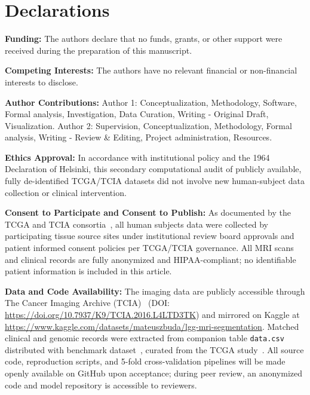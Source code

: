 \documentclass[11pt,a4paper]{article}
\begin{document}
\section*{Declarations}
\begingroup
\fontsize{7.5pt}{8.8pt}\selectfont
\noindent\textbf{Funding:} The authors declare that no funds, grants, or other support were received during the preparation of this manuscript.\par\vspace{0.005em}
\noindent\textbf{Competing Interests:} The authors have no relevant financial or non-financial interests to disclose.\par\vspace{0.005em}
\noindent\textbf{Author Contributions:} Author 1: Conceptualization, Methodology, Software, Formal analysis, Investigation, Data Curation, Writing - Original Draft, Visualization. Author 2: Supervision, Conceptualization, Methodology, Formal analysis, Writing - Review \& Editing, Project administration, Resources.\par\vspace{0.005em}
\noindent\textbf{Ethics Approval:} In accordance with institutional policy and the 1964 Declaration of Helsinki, this secondary computational audit of publicly available, fully de-identified TCGA/TCIA datasets did not involve new human-subject data collection or clinical intervention.\par\vspace{0.005em}
\noindent\textbf{Consent to Participate and Consent to Publish:} As documented by the TCGA and TCIA consortia~\cite{clark2013cancer,pedano2016cancer}, all human subjects data were collected by participating tissue source sites under institutional review board approvals and patient informed consent policies per TCGA/TCIA governance. All MRI scans and clinical records are fully anonymized and HIPAA-compliant; no identifiable patient information is included in this article.\par\vspace{0.005em}
\noindent\textbf{Data and Code Availability:} The imaging data are publicly accessible through The Cancer Imaging Archive (TCIA)~\cite{clark2013cancer,pedano2016cancer} (DOI: \url{https://doi.org/10.7937/K9/TCIA.2016.L4LTD3TK}) and mirrored on Kaggle at \url{https://www.kaggle.com/datasets/mateuszbuda/lgg-mri-segmentation}. Matched clinical and genomic records were extracted from companion table \texttt{data.csv} distributed with benchmark dataset~\cite{buda2019association,pedano2016cancer}, curated from the TCGA study~\cite{ceccarelli2016molecular}. All source code, reproduction scripts, and 5-fold cross-validation pipelines will be made openly available on GitHub upon acceptance; during peer review, an anonymized code and model repository is accessible to reviewers.\par\vspace{0.005em}
\endgroup

\begingroup
\scriptsize
\setlength{\bibsep}{-1.8pt}


\clearpage

\endgroup
\end{document}
